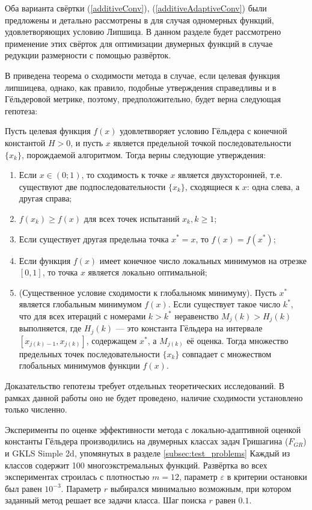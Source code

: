 Оба варианта свёртки (\ref{additiveConv}), (\ref{additiveAdaptiveConv}) были предложены
и детально рассмотрены в \cite{sergLocalTuning} для случая одномерных функций,
удовлетворяющих условию Липшица. В данном разделе будет рассмотрено применение этих
свёрток для оптимизации двумерных функций в случае редукции размерности с помощью развёрток.

В \cite{sergLocalTuning} приведена теорема о сходимости метода в случае, если целевая функция
липшицева, однако, как правило, подобные утверждения справедливы и в Гёльдеровой метрике, поэтому,
предположительно, будет верна следующая гепотеза:
\begin{hypothesis}
Пусть целевая функция \(f(x)\) удовлетвворяет условию Гёльдера с конечной константой
\(H > 0\), и пусть \(x\) является предельной точкой последовательности \(\{x_k\}\),
порождаемой алгоритмом. Тогда верны следующие утверждения:
\begin{enumerate}
  \item Если \(x\in(0;1)\), то сходимость к точке \(x\) является двухсторонней, т.е.
  существуют две подпоследовательности \(\{x_k\}\), сходящиеся к \(x\): одна слева,
  а другая справа;
  \item \(f(x_k) \geqslant f(x)\) для всех точек испытаний \(x_k, k \geqslant 1\);
  \item Если существует другая предельна точка \(x^* = x\), то \(f(x) = f(x^*)\);
  \item Если функция \(f(x)\) имеет конечное число локальных минимумов на отрезке \([0, 1]\),
  то точка \(x\) является локально оптимальной;
  \item (Существенное условие сходимости к глобальномк минимуму). Пусть \(x^*\)
  является глобальным минимумом \(f(x)\). Если существует такое число \(k^*\),
  что для всех итераций с номерами \(k > k^*\) неравенство
  \(M_j(k) > H_j(k)\) выполняется, где \(H_j(k)\) --- это константа Гёльдера на интервале
  \([x_{j(k)-1}, x_{j(k)}]\), содержащем \(x^*\), а \(M_{j(k)}\) её оценка.
  Тогда множество предельных точек последовательности \(\{x_k\}\) совпадает с множеством
  глобальных минимумов функции \(f(x)\).
\end{enumerate}
\end{hypothesis}

Доказательство гепотезы требует отдельных теоретических исследований. В рамках данной
работы оно не будет проведено, наличие сходимости установлено только численно.

Эксперименты по оценке эффективности метода с локально-адаптивной оценкой константы
Гёльдера производились на двумерных классах задач Гришагина (\(F_{GR}\))
и GKLS Simple 2d, упомянутых в разделе \ref{subsec:test_problems}
Каждый из классов содержит 100 многоэкстремальных функций. Развёртка во всех экспериментах
строилась с плотностью \(m=12\), параметр \(\varepsilon\) в критерии остановки был равен \(10^{-3}\).
Параметр \(r\) выбирался минимально возможным, при котором заданный метод решает все
задачи класса. Шаг поиска \(r\) равен \(0.1\).

